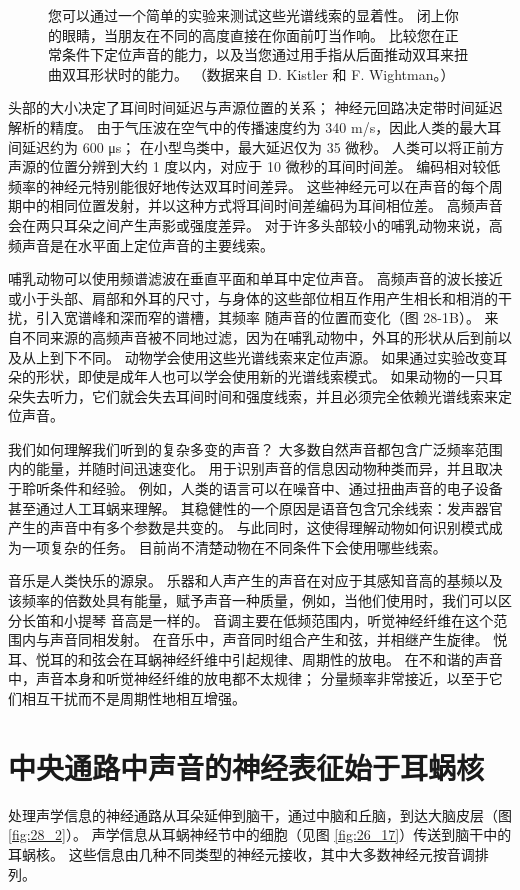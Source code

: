 \begin{figure}[htbp]
{	您可以通过一个简单的实验来测试这些光谱线索的显着性。 闭上你的眼睛，当朋友在不同的高度直接在你面前叮当作响。 比较您在正常条件下定位声音的能力，以及当您通过用手指从后面推动双耳来扭曲双耳形状时的能力。 （数据来自 D. Kistler 和 F. Wightman。）}
	\label{fig:28_1}
\end{figure}

头部的大小决定了耳间时间延迟与声源位置的关系； 神经元回路决定带时间延迟解析的精度。 由于气压波在空气中的传播速度约为 340 m/s，因此人类的最大耳间延迟约为 600 μs； 在小型鸟类中，最大延迟仅为 35 微秒。 人类可以将正前方声源的位置分辨到大约 1 度以内，对应于 10 微秒的耳间时间差。 编码相对较低频率的神经元特别能很好地传达双耳时间差异。 这些神经元可以在声音的每个周期中的相同位置发射，并以这种方式将耳间时间差编码为耳间相位差。 高频声音会在两只耳朵之间产生声影或强度差异。 对于许多头部较小的哺乳动物来说，高频声音是在水平面上定位声音的主要线索。

哺乳动物可以使用频谱滤波在垂直平面和单耳中定位声音。 高频声音的波长接近或小于头部、肩部和外耳的尺寸，与身体的这些部位相互作用产生相长和相消的干扰，引入宽谱峰和深而窄的谱槽，其频率 随声音的位置而变化（图 28-1B）。 来自不同来源的高频声音被不同地过滤，因为在哺乳动物中，外耳的形状从后到前以及从上到下不同。 动物学会使用这些光谱线索来定位声源。 如果通过实验改变耳朵的形状，即使是成年人也可以学会使用新的光谱线索模式。 如果动物的一只耳朵失去听力，它们就会失去耳间时间和强度线索，并且必须完全依赖光谱线索来定位声音。

我们如何理解我们听到的复杂多变的声音？ 大多数自然声音都包含广泛频率范围内的能量，并随时间迅速变化。 用于识别声音的信息因动物种类而异，并且取决于聆听条件和经验。 例如，人类的语言可以在噪音中、通过扭曲声音的电子设备甚至通过人工耳蜗来理解。 其稳健性的一个原因是语音包含冗余线索：发声器官产生的声音中有多个参数是共变的。 与此同时，这使得理解动物如何识别模式成为一项复杂的任务。 目前尚不清楚动物在不同条件下会使用哪些线索。

音乐是人类快乐的源泉。 乐器和人声产生的声音在对应于其感知音高的基频以及该频率的倍数处具有能量，赋予声音一种质量，例如，当他们使用时，我们可以区分长笛和小提琴 音高是一样的。 音调主要在低频范围内，听觉神经纤维在这个范围内与声音同相发射。 在音乐中，声音同时组合产生和弦，并相继产生旋律。 悦耳、悦耳的和弦会在耳蜗神经纤维中引起规律、周期性的放电。 在不和谐的声音中，声音本身和听觉神经纤维的放电都不太规律； 分量频率非常接近，以至于它们相互干扰而不是周期性地相互增强。


\section{中央通路中声音的神经表征始于耳蜗核}
处理声学信息的神经通路从耳朵延伸到脑干，通过中脑和丘脑，到达大脑皮层（图 \ref{fig:28_2}）。 声学信息从耳蜗神经节中的细胞（见图 \ref{fig:26_17}）传送到脑干中的耳蜗核。 这些信息由几种不同类型的神经元接收，其中大多数神经元按音调排列。

